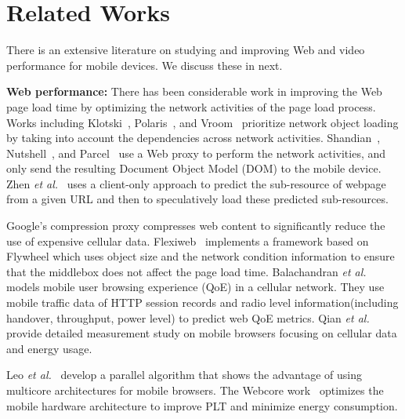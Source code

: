 \section{Related Works}

There is an extensive literature on studying and improving Web and video performance for mobile devices. We discuss these in next. 

\noindent\textbf{Web performance:}
There has been considerable work in improving the Web page load time by optimizing the network activities of the page load process. Works including Klotski~\cite{butkiewicz2015klotski}, Polaris~\cite{netravali2016polaris}, and Vroom~\cite{ruamviboonsuk2017vroom} prioritize network object loading by taking into account the dependencies across network activities. 
Shandian~\cite{wang2016speeding}, Nutshell~\cite{sivakumar2017nutshell}, and Parcel~\cite{sivakumar2014parcel} use a Web proxy to perform the network activities, and only send the resulting Document Object Model (DOM) to the mobile device. Zhen \emph{et al.}~\cite{wang2012far} uses a client-only approach to predict the sub-resource of  webpage from a given URL and then to speculatively load these predicted sub-resources. 

Google's compression proxy \cite{agababov2015flywheel} compresses web content to significantly reduce the use of expensive cellular data.
Flexiweb~\cite{singh2015flexiweb} implements a framework based on Flywheel which uses object size and the network condition information to ensure that the middlebox does not affect the page load time. 
Balachandran \emph{et al.}~\cite{balachandran2014modeling} models mobile user browsing experience (QoE) in a cellular network. 
They use mobile traffic data of HTTP session records and radio level information(including handover, throughput, power level)  to predict web QoE metrics. %
Qian \emph{et al.}~\cite{qian2014characterizing} provide detailed measurement study on mobile browsers focusing on cellular data and energy usage. 

Leo \emph{et al.}~\cite{meyerovich2010fast} develop a parallel algorithm that shows the advantage of using multicore architectures for mobile browsers. The Webcore work~\cite{zhu2017optimizing} optimizes the mobile
hardware architecture to improve PLT and minimize energy consumption.

